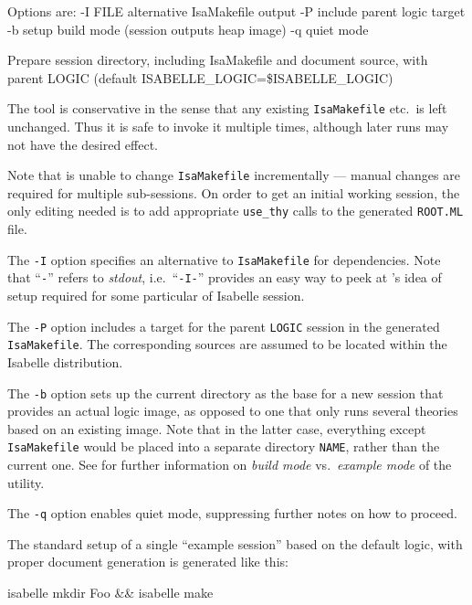 \begin{isabellebody}
\begin{isamarkuptext}
\begin{ttbox}
  Options are:
    -I FILE      alternative IsaMakefile output
    -P           include parent logic target
    -b           setup build mode (session outputs heap image)
    -q           quiet mode

  Prepare session directory, including IsaMakefile and document source,
  with parent LOGIC (default ISABELLE_LOGIC=\$ISABELLE_LOGIC)
\end{ttbox}

  The \hyperlink{tool.mkdir}{\mbox{}} tool is conservative in the sense that any
  existing \verb|IsaMakefile| etc.\ is left unchanged.  Thus it
  is safe to invoke it multiple times, although later runs may not
  have the desired effect.

  Note that \hyperlink{tool.mkdir}{\mbox{}} is unable to change \verb|IsaMakefile|
  incrementally --- manual changes are required for multiple
  sub-sessions.  On order to get an initial working session, the only
  editing needed is to add appropriate \verb|use_thy| calls to the
  generated \verb|ROOT.ML| file.%
\end{isamarkuptext}%
\isamarkuptrue%
%
\isamarkuptrue%
%
\begin{isamarkuptext}%
The \verb|-I| option specifies an alternative to \verb|IsaMakefile| for dependencies.  Note that ``\verb|-|'' refers
  to \emph{stdout}, i.e.\ ``\verb|-I-|'' provides an easy way
  to peek at \hyperlink{tool.mkdir}{\mbox{}}'s idea of \hyperlink{tool.make}{\mbox{}} setup required for
  some particular of Isabelle session.

  \medskip The \verb|-P| option includes a target for the
  parent \verb|LOGIC| session in the generated \verb|IsaMakefile|.  The corresponding sources are assumed to be located
  within the Isabelle distribution.

  \medskip The \verb|-b| option sets up the current directory
  as the base for a new session that provides an actual logic image,
  as opposed to one that only runs several theories based on an
  existing image.  Note that in the latter case, everything except
  \verb|IsaMakefile| would be placed into a separate directory
  \verb|NAME|, rather than the current one.  See
   for further information on \emph{build
  mode} vs.\ \emph{example mode} of the \hyperlink{tool.usedir}{\mbox{}} utility.

  \medskip The \verb|-q| option enables quiet mode, suppressing
  further notes on how to proceed.%
\end{isamarkuptext}%
\isamarkuptrue%
%
\isamarkuptrue%
%
\begin{isamarkuptext}%
The standard setup of a single ``example session'' based on the
  default logic, with proper document generation is generated like
  this:
\begin{ttbox}
isabelle mkdir Foo && isabelle make
\end{ttbox}


\end{isamarkuptext}
\end{isabellebody}
